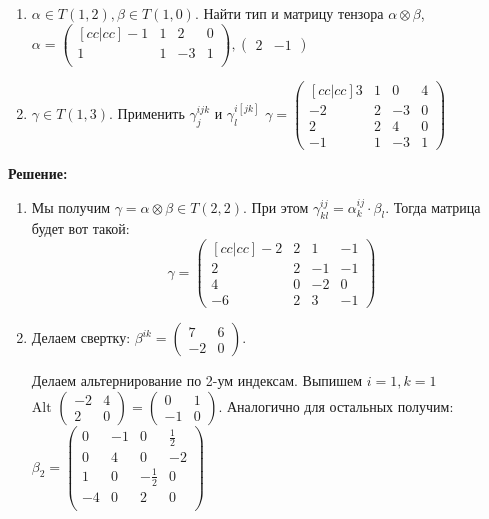 \documentclass{article}
\newcommand{\Alt}{\text{Alt }}
\begin{document}
\begin{enumerate}
    \item $\alpha \in T(1,2), \beta \in T(1,0)$. Найти тип и матрицу тензора $\alpha\otimes \beta$, $\alpha =\begin{pmatrix}[cc|cc]
        -1 & 1 & 2 & 0\\
        1 & 1 & -3 & 1\\
    \end{pmatrix}, \begin{pmatrix}
        2 & -1
    \end{pmatrix}$ 
    \item $\gamma \in T(1,3)$. Применить $\gamma^{ijk}_j$ и $\gamma^{i[jk]}_l$ $\gamma = \begin{pmatrix}[cc|cc]
        3 &1 & 0 & 4\\
        -2 & 2 & -3 & 0\\
        \hline 2& 2 & 4 & 0\\
        -1 & 1 & -3 & 1
    \end{pmatrix}$
\end{enumerate}

\textbf{Решение:}
\begin{enumerate}
    \item Мы получим $\gamma = \alpha \otimes \beta  \in T(2,2)$. При этом
    $\gamma^{ij}_{kl} = \alpha^{ij}_k\cdot \beta_l$. Тогда матрица будет вот такой:
    $$\gamma = \begin{pmatrix}[cc|cc]
        -2 & 2 & 1 & -1\\
        2 & 2  & -1 & -1\\
        \hline 4 &0 & -2 & 0\\
        -6 &2&3&-1
    \end{pmatrix}$$
    \item Делаем свертку: $\beta^{ik} = \begin{pmatrix}
        7 & 6 \\
        -2 & 0
    \end{pmatrix}$. 
    
    Делаем альтернирование  по 2-ум индексам. Выпишем $i=1,k=1$ $\Alt \begin{pmatrix}
        -2 & 4 \\
        2 & 0
    \end{pmatrix} = \begin{pmatrix}
        0 & 1\\
        -1 & 0
    \end{pmatrix} $. Аналогично для остальных получим:
    $\beta_2 =\begin{pmatrix}
        0 & -1& 0&\frac{1}{2}\\
        0 & 4& 0&-2\\
        1& 0& -\frac{1}{2}&0\\
        -4 & 0& 2&0\\
    \end{pmatrix}$
\end{enumerate}
\end{document}
